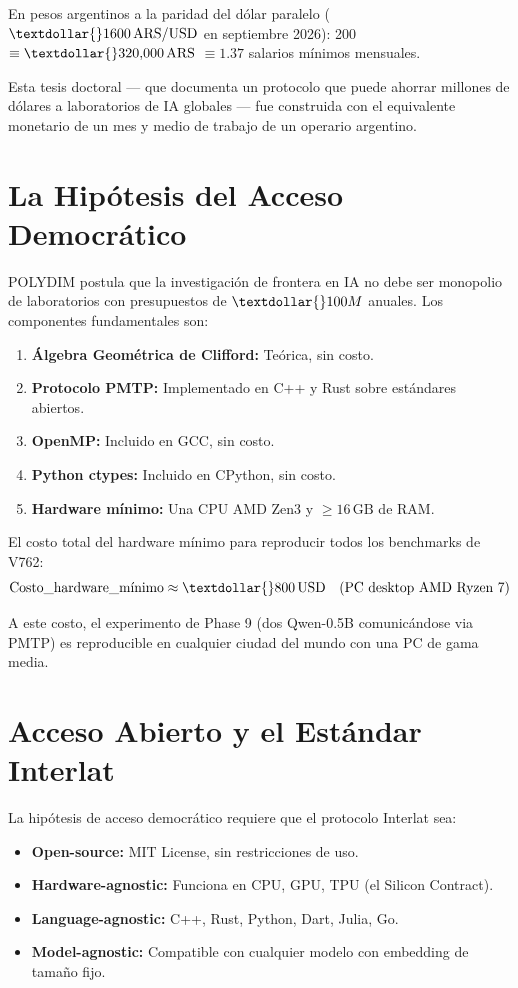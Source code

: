 En pesos argentinos a la paridad del dólar paralelo ($\textdollar{}1600\,\text{ARS/USD}$ en septiembre 2026):
\textdollar{}200\, $\equiv \textdollar{}320{,}000\,\text{ARS}$ $\equiv 1.37$ salarios mínimos mensuales.

Esta tesis doctoral --- que documenta un protocolo que puede ahorrar millones de
dólares a laboratorios de IA globales --- fue construida con el equivalente monetario
de un mes y medio de trabajo de un operario argentino.

\section{La Hipótesis del Acceso Democrático}

POLYDIM postula que la investigación de frontera en IA no debe ser monopolio de
laboratorios con presupuestos de $\textdollar{}100M$ anuales. Los componentes fundamentales son:

\begin{enumerate}
\item \textbf{Álgebra Geométrica de Clifford:} Teórica, sin costo.
\item \textbf{Protocolo PMTP:} Implementado en C++ y Rust sobre estándares abiertos.
\item \textbf{OpenMP:} Incluido en GCC, sin costo.
\item \textbf{Python ctypes:} Incluido en CPython, sin costo.
\item \textbf{Hardware mínimo:} Una CPU AMD Zen3 y $\ge 16\,\text{GB}$ de RAM.
\end{enumerate}

El costo total del hardware mínimo para reproducir todos los benchmarks de V762:
\begin{equation}
\text{Costo\_hardware\_mínimo} \approx \textdollar{}800\,\text{USD} \quad \text{(PC desktop AMD Ryzen 7)}
\end{equation}

A este costo, el experimento de Phase 9 (dos Qwen-0.5B comunicándose via PMTP)
es reproducible en cualquier ciudad del mundo con una PC de gama media.

\section{Acceso Abierto y el Estándar Interlat}

La hipótesis de acceso democrático requiere que el protocolo Interlat sea:
\begin{itemize}
\item \textbf{Open-source:} MIT License, sin restricciones de uso.
\item \textbf{Hardware-agnostic:} Funciona en CPU, GPU, TPU (el Silicon Contract).
\item \textbf{Language-agnostic:} C++, Rust, Python, Dart, Julia, Go.
\item \textbf{Model-agnostic:} Compatible con cualquier modelo con embedding de tamaño fijo.
\end{itemize}


